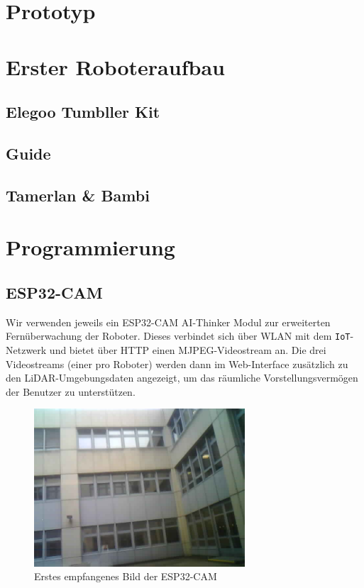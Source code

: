 \documentclass[12pt]{article}
\begin{document}
	\section{Prototyp}
	\section{Erster Roboteraufbau}
	\subsection{Elegoo Tumbller Kit}
	\subsection{Guide}
	\subsection{Tamerlan \& Bambi}
	\section{Programmierung}
	\subsection{ESP32-CAM}
	Wir verwenden jeweils ein ESP32-CAM AI-Thinker Modul zur erweiterten
	Fernüberwachung der Roboter.
	Dieses verbindet sich über WLAN mit dem \verb|IoT|-Netzwerk und bietet über HTTP einen MJPEG-Videostream an.
	Die drei Videostreams (einer pro Roboter) werden dann im Web-Interface
	zusätzlich zu den LiDAR-Umgebungsdaten angezeigt,
	um das räumliche Vorstellungsvermögen der Benutzer zu unterstützen.
	\begin{figure}[H]
		\includegraphics[width=0.7\textwidth, center]{img/cam_erstes_bild.png}
		\caption{Erstes empfangenes Bild der ESP32-CAM}
		\label{cam_erstes_bild}
	\end{figure}
\end{document}
